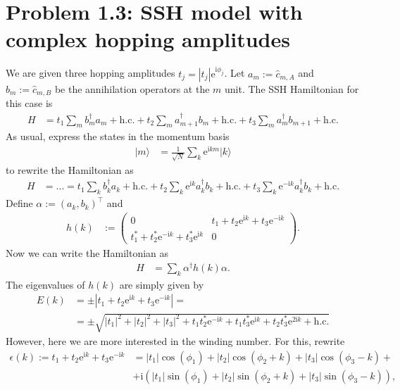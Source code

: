 \documentclass[english, parskip=full]{scrartcl}
\newcommand{\kla}{}
\newcommand{\tecxt}{}
\newcommand{\Ket}{}
\renewcommand{\i}{\text{i}}
\newcommand{\e}{\text{e}}
\begin{document}
\section*{Problem 1.3: SSH model with complex hopping amplitudes}
We are given three hopping amplitudes $t_j=|t_j|\e^{\i\phi_j}$.
Let $a_m:= \hat{c}_{m,A}$ and $b_m:=\hat{c}_{m,B}$ be the annihilation operators at the $m$ unit.
The SSH Hamiltonian for this case is 
\begin{align}
H&=t_1\sum_m b^\dagger_m a_m+\tecxt\text{h.c.} + t_2\sum_m a^\dagger _{m+1}b_m+\tecxt\text{h.c.}+t_3\sum_m a^\dagger_m b_{m+1}+\tecxt\text{h.c.}
\end{align}
As usual, express the states in the momentum basis
\begin{align}
\Ket | m \rangle&=\frac{1}{\sqrt{N}}\sum_k\e^{\i km}\Ket | k \rangle
\end{align}
to rewrite the Hamiltonian as 
\begin{align}
H&=\dots=t_1\sum_k b_k^\dagger a_k+\tecxt\text{h.c.} + t_2\sum_k \e^{\i k}a_k^\dagger b_k+\tecxt\text{h.c.}+t_3\sum_k\e^{-\i k}a_k^\dagger b_k+\tecxt\text{h.c.}
\end{align}
Define $\alpha:=(a_k,b_k)^\top$ and
\begin{align}
h(k)&:=\begin{pmatrix}
0 & t_1+t_2\e^{\i k}+t_3\e^{-\i k} \\ 
t_1^\ast + t_2^\ast\e^{-\i k}+t_3^\ast\e^{\i k} & 0
\end{pmatrix}.
\end{align}
Now we can write the Hamiltonian as
\begin{align}
H&=\sum_k\alpha^\dagger h(k)\alpha.
\end{align}
The eigenvalues of $h(k)$ are simply given by
\begin{align}
E(k)&=\pm\left\vert t_1+t_2\e^{\i k}+t_3\e^{-\i k} \right\vert=\\
&=\pm\sqrt{|t_1|^2+|t_2|^2+|t_3|^2+t_1t_2^\ast\e^{-\i k}+t_1t_3^\ast\e^{\i k} + t_2t_3^\ast\e^{2\i k} + \tecxt\text{h.c.}}
\end{align}
However, here we are more interested in the winding number.
For this, rewrite
\begin{align}
\epsilon(k):=t_1+t_2\e^{\i k}+t_3\e^{-\i k}&=|t_1|\cos(\phi_1) + |t_2|\cos(\phi_2+k) + |t_3|\cos(\phi_3-k)+\\
&+\i\kla\left( |t_1|\sin(\phi_1) + |t_2|\sin(\phi_2+k) + |t_3|\sin(\phi_3-k) \right),
\end{align}
\end{document}
